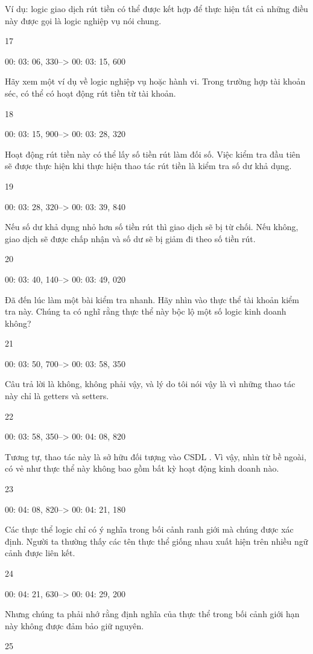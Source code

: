 Ví dụ: logic giao dịch rút tiền có thể được kết hợp để thực hiện tất cả những điều này được gọi là logic nghiệp vụ nói chung.

17

00: 03: 06, 330--> 00: 03: 15, 600

Hãy xem một ví dụ về logic nghiệp vụ hoặc hành vi. Trong trường hợp tài khoản séc, có thể có hoạt động rút tiền từ tài khoản.

18

00: 03: 15, 900--> 00: 03: 28, 320

Hoạt động rút tiền này có thể lấy số tiền rút làm đối số. Việc kiểm tra đầu tiên sẽ được thực hiện khi thực hiện thao tác rút tiền là kiểm tra số dư khả dụng.

19

00: 03: 28, 320--> 00: 03: 39, 840

Nếu số dư khả dụng nhỏ hơn số tiền rút thì giao dịch sẽ bị từ chối. Nếu không, giao dịch sẽ được chấp nhận và số dư sẽ bị giảm đi theo số tiền rút.

20

00: 03: 40, 140--> 00: 03: 49, 020

Đã đến lúc làm một bài kiểm tra nhanh. Hãy nhìn vào thực thể tài khoản kiểm tra này. Chúng ta có nghĩ rằng thực thể này bộc lộ một số logic kinh doanh không?

21

00: 03: 50, 700--> 00: 03: 58, 350

Câu trả lời là không, không phải vậy, và lý do tôi nói vậy là vì những thao tác này chỉ là getters và setters.

22

00: 03: 58, 350--> 00: 04: 08, 820

Tương tự, thao tác này là sở hữu đối tượng vào CSDL . Vì vậy, nhìn từ bề ngoài, có vẻ như thực thể này không bao gồm bất kỳ hoạt động kinh doanh nào.

23

00: 04: 08, 820--> 00: 04: 21, 180

Các thực thể logic chỉ có ý nghĩa trong bối cảnh ranh giới mà chúng được xác định. Người ta thường thấy các tên thực thể giống nhau xuất hiện trên nhiều ngữ cảnh được liên kết.

24

00: 04: 21, 630--> 00: 04: 29, 200

Nhưng chúng ta phải nhớ rằng định nghĩa của thực thể trong bối cảnh giới hạn này không được đảm bảo giữ nguyên.

25

